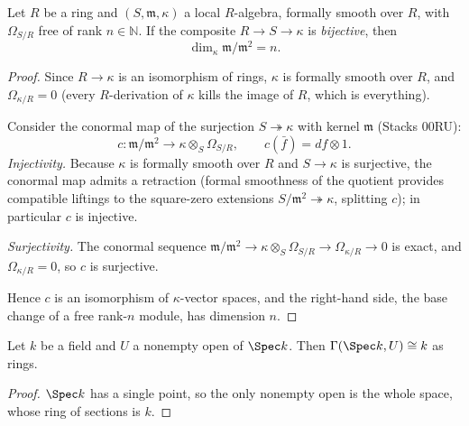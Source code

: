 \begin{theorem}
  \label{thm:cotangent_finrank_rational}
  \leanok
  Let \(R\) be a ring and \((S, \mathfrak m, \kappa)\) a local \(R\)-algebra,
  formally smooth over \(R\), with \(\Omega_{S/R}\) free of rank
  \(n \in \mathbb{N}\). If the composite \(R \to S \to \kappa\) is
  \emph{bijective}, then
  \[
    \dim_\kappa \mathfrak m/\mathfrak m^2 = n .
  \]
\end{theorem}
\begin{proof}
  \leanok
  Since \(R \to \kappa\) is an isomorphism of rings, \(\kappa\) is formally
  smooth over \(R\), and \(\Omega_{\kappa/R} = 0\) (every \(R\)-derivation of
  \(\kappa\) kills the image of \(R\), which is everything).

  Consider the conormal map of the surjection \(S \twoheadrightarrow \kappa\)
  with kernel \(\mathfrak m\) (Stacks 00RU):
  \[
    c : \mathfrak m/\mathfrak m^2 \longrightarrow
    \kappa \otimes_S \Omega_{S/R},
    \qquad c(\bar f) = df \otimes 1 .
  \]
  \emph{Injectivity.} Because \(\kappa\) is formally smooth over \(R\) and
  \(S \to \kappa\) is surjective, the conormal map admits a retraction (formal
  smoothness of the quotient provides compatible liftings to the square-zero
  extensions \(S/\mathfrak m^2 \twoheadrightarrow \kappa\), splitting \(c\));
  in particular \(c\) is injective.

  \emph{Surjectivity.} The conormal sequence
  \(\mathfrak m/\mathfrak m^2 \to \kappa \otimes_S \Omega_{S/R} \to
  \Omega_{\kappa/R} \to 0\) is exact, and \(\Omega_{\kappa/R} = 0\), so \(c\)
  is surjective.

  Hence \(c\) is an isomorphism of \(\kappa\)-vector spaces, and the right-hand
  side, the base change of a free rank-\(n\) module, has dimension \(n\).
\end{proof}

\begin{lemma}
  \label{lem:gamma_spec_field}
  \leanok
  Let \(k\) be a field and \(U\) a nonempty open of \(\Spec k\). Then
  \(\Gamma(\Spec k, U) \cong k\) as rings.
\end{lemma}
\begin{proof}
  \leanok
  \(\Spec k\) has a single point, so the only nonempty open is the whole space,
  whose ring of sections is \(k\).
\end{proof}

